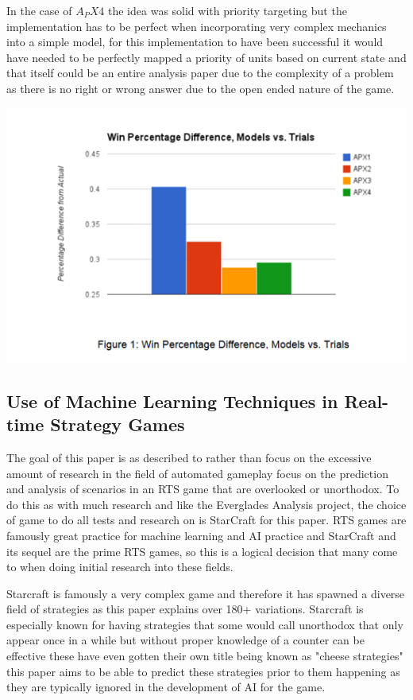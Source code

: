 \documentclass[a4paper,12pt]{report}
\begin{document}
In the case of $A_PX4$ the idea was solid with priority targeting but the implementation has to be perfect when incorporating very complex mechanics into a simple model, for this implementation to have been successful it would have needed to be perfectly mapped a priority of units based on current state and that itself could be an entire analysis paper due to the complexity of a problem as there is no right or wrong answer due to the open ended nature of the game.

\begin{center}
    \captionsetup{type=figure}
    \includegraphics[width=.9\linewidth]{media/APXModelDiff.png}
\end{center}

\subsection{Use of Machine Learning Techniques in Real-time Strategy Games}

The goal of this paper is as described to rather than focus on the excessive amount of research in the field of automated gameplay focus on the prediction and analysis of scenarios in an RTS game that are overlooked or unorthodox. To do this as with much research and like the Everglades Analysis project, the choice of game to do all tests and research on is StarCraft for this paper. RTS games are famously great practice for machine learning and AI practice and StarCraft and its sequel are the prime RTS games, so this is a logical decision that many come to when doing initial research into these fields.

Starcraft is famously a very complex game and therefore it has spawned a diverse field of strategies as this paper explains over 180+ variations. Starcraft is especially known for having strategies that some would call unorthodox that only appear once in a while but without proper knowledge of a counter can be effective these have even gotten their own title being known as "cheese strategies" this paper aims to be able to predict these strategies prior to them happening as they are typically ignored in the development of AI for the game.
        	
\end{document}
